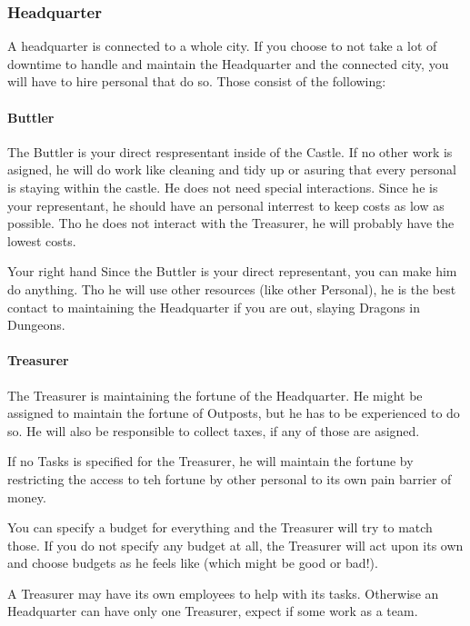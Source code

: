 \documentclass[10pt,twoside,twocolumn,openany]{book}
\begin{document}
\subsubsection{Headquarter}

A headquarter is connected to a whole city. If you choose to not take a lot of downtime to handle and maintain the Headquarter and the connected city, you will have to hire personal that do so. Those consist of the following:

\paragraph{Buttler}

The Buttler is your direct respresentant inside of the Castle. If no other work is asigned, he will do work like cleaning and tidy up or asuring that every personal is staying within the castle. He does not need special interactions. Since he is your representant, he should have an personal interrest to keep costs as low as possible. Tho he does not interact with the Treasurer, he will probably have the lowest costs.

\begin{paperbox}{Your right hand}
Since the Buttler is your direct representant, you can make him do anything. Tho he will use other resources (like other Personal), he is the best contact to maintaining the Headquarter if you are out, slaying Dragons in Dungeons.
\end{paperbox}

\paragraph{Treasurer}

The Treasurer is maintaining the fortune of the Headquarter. He might be assigned to maintain the fortune of Outposts, but he has to be experienced to do so. He will also be responsible to collect taxes, if any of those are asigned.

If no Tasks is specified for the Treasurer, he will maintain the fortune by restricting the access to teh fortune by other personal to its own pain barrier of money.

You can specify a budget for everything and the Treasurer will try to match those. If you do not specify any budget at all, the Treasurer will act upon its own and choose budgets as he feels like (which might be good or bad!).

A Treasurer may have its own employees to help with its tasks. Otherwise an Headquarter can have only one Treasurer, expect if some work as a team.
\end{document}
